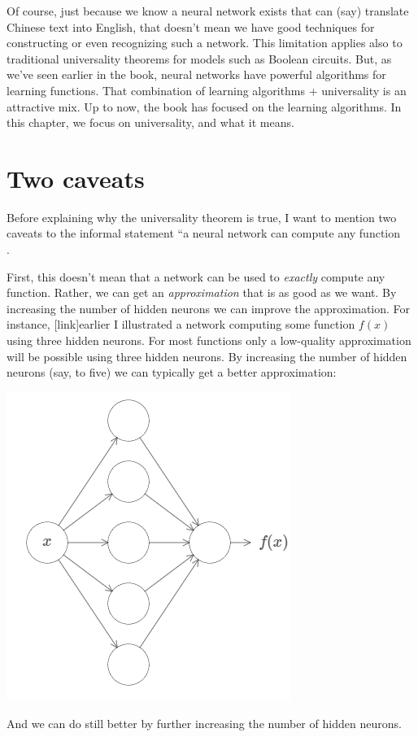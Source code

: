 \documentclass[a4paper,twoside,10pt]{book}
\begin{document}
Of course, just because we know a neural network exists that can (say) translate Chinese text into English, that doesn't mean we have good techniques for constructing or even recognizing such a network. This limitation applies also to traditional universality theorems for models such as Boolean circuits. But, as we've seen earlier in the book, neural networks have powerful algorithms for learning functions. That combination of learning algorithms + universality is an attractive mix. Up to now, the book has focused on the learning algorithms. In this chapter, we focus on universality, and what it means.


\section{Two caveats}
Before explaining why the universality theorem is true, I want to mention two caveats to the informal statement ``a neural network can compute any function\\.

First, this doesn't mean that a network can be used to \textit{exactly} compute any function. Rather, we can get an \textit{approximation} that is as good as we want. By increasing the number of hidden neurons we can improve the approximation. For instance, [link]earlier I illustrated a network computing some function $f(x)$ using three hidden neurons. For most functions only a low-quality approximation will be possible using three hidden neurons. By increasing the number of hidden neurons (say, to five) we can typically get a better approximation:
\begin{center}
	\includegraphics[width=0.55\linewidth]{figures/ch4/tikz402}
\end{center}
And we can do still better by further increasing the number of hidden neurons.
\end{document}
